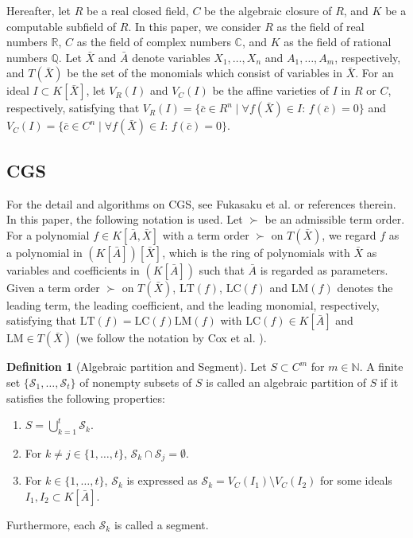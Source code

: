 \documentclass{birkjour}
\theoremstyle{plain}
\theoremstyle{definition}
\newtheorem{definition}[theorem]{Definition}
\newcommand{\R}[0]{\mathbb{R}}
\newcommand{\C}[0]{\mathbb{C}}
\newcommand{\Q}[0]{\mathbb{Q}}
\newcommand{\N}[0]{\mathbb{N}}
\newcommand{\Abar}{\bar{A}}
\newcommand{\cbar}[0]{\bar{c}}
\newcommand{\Xbar}{\bar{X}}
\newcommand{\lt}{\mathrm{LT}}
\newcommand{\lm}{\mathrm{LM}}
\newcommand{\lc}{\mathrm{LC}}
\begin{document}
    Hereafter, let $R$ be a real closed field, $C$ be the algebraic closure of $R$, and
    $K$ be a computable subfield of $R$. 
    In this paper, we consider $R$ as the field of 
    real numbers $\R$, $C$ as the field of complex numbers $\C$, and $K$ as 
    the field of rational numbers $\Q$.
    Let $\Xbar$ and $\Abar$ denote variables $X_1,\dots,X_n$ and $A_1,\dots,A_m$,
    respectively, and $T(\Xbar)$ be the set of the monomials
    which consist of variables in $\Xbar$. For an ideal $I\subset K[\Xbar]$, let
    $V_R(I)$ and $V_C(I)$ be the affine varieties of $I$ in $R$ or $C$, respectively, 
    satisfying that 
    $V_R(I)=\{\cbar\in R^n\mid \mbox{$\forall f(\Xbar)\in I$: $f(\cbar)=0$}\}$
    and
    $V_C(I)=\{\cbar\in C^n\mid \mbox{$\forall f(\Xbar)\in I$: $f(\cbar)=0$}\}$.

    \subsection{CGS}

    For the detail and algorithms on CGS, see Fukasaku et al. \cite{fuk-iwa-sat2015} or references therein. 
    In this paper, the following notation is used. 
    Let $\succ$ be an admissible term order. For a polynomial $f\in K[\Abar,\Xbar]$ with
    a term order $\succ$ on $T(\Xbar)$, we regard $f$ as a polynomial in 
    $(K[\Abar])[\Xbar]$, which is the ring of polynomials with $\Xbar$ as variables and
    coefficients in $(K[\Abar])$ such that $\Abar$ is regarded as parameters.
    Given a term order $\succ$ on $T(\Xbar)$,
    $\lt(f)$, $\lc(f)$ and $\lm(f)$ denotes the leading term,
    the leading coefficient, and the leading monomial, respectively, satisfying that
    $\lt(f)=\lc(f)\lm(f)$ with $\lc(f)\in K[\Abar]$ and $\lm\in T(\Xbar)$
    (we follow the notation by Cox et al. \cite{cox-lit-osh2015}). 

    \begin{definition}[Algebraic partition and Segment]
        Let $S\subset C^m$ for $m\in\N$. A finite set 
        $\{\mathcal{S}_1,\dots,\mathcal{S}_t\}$ of nonempty subsets of $S$ 
        is called an algebraic partition of $S$ if it satisfies the following 
        properties:
        \begin{enumerate}
            \item $S=\bigcup_{k=1}^t\mathcal{S}_k$.
            \item For $k\ne j\in\{1,\dots,t\}$, $\mathcal{S}_k\cap\mathcal{S}_j=\emptyset$.
            \item For $k\in\{1,\dots,t\}$, $\mathcal{S}_k$ is expressed as
            $\mathcal{S}_k=V_C(I_1)\setminus V_C(I_2)$ for some ideals $I_1,I_2\subset K[\Abar]$.
        \end{enumerate}
        Furthermore, each $\mathcal{S}_k$ is called a segment.
    \end{definition}
\end{document}
